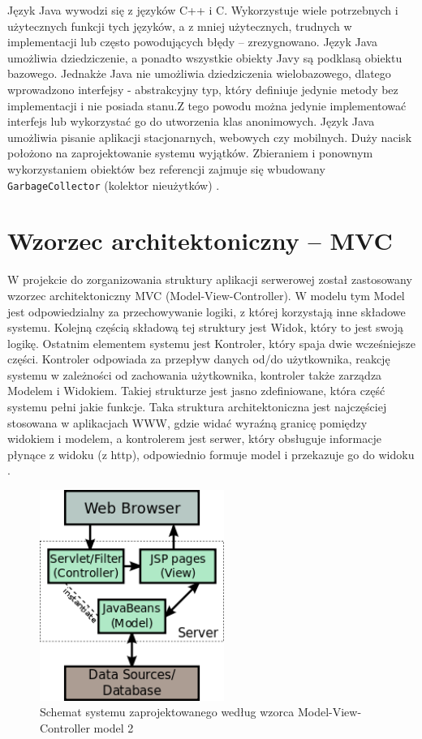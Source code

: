 \documentclass[eng,printmode,oneside]{mgr}
\begin{document}
Język Java wywodzi się z języków C++ i C. Wykorzystuje wiele potrzebnych i
użytecznych funkcji tych języków, a z mniej użytecznych, trudnych w
implementacji lub często powodujących błędy -- zrezygnowano. Język Java
umożliwia dziedziczenie, a ponadto wszystkie obiekty Javy są podklasą obiektu
bazowego. Jednakże Java nie umożliwia dziedziczenia wielobazowego, dlatego wprowadzono interfejsy -
abstrakcyjny typ, który definiuje jedynie metody bez implementacji i nie
posiada stanu.Z tego powodu można jedynie implementować
interfejs lub wykorzystać go do utworzenia klas anonimowych. Język Java
umożliwia pisanie aplikacji stacjonarnych, webowych czy mobilnych. Duży nacisk
położono na zaprojektowanie systemu wyjątków. Zbieraniem i ponownym
wykorzystaniem obiektów bez referencji zajmuje się wbudowany
\texttt{GarbageCollector} (kolektor nieużytków) \cite{java.doc}.

\section{Wzorzec architektoniczny -- MVC}

W projekcie do zorganizowania struktury aplikacji serwerowej został zastosowany
wzorzec architektoniczny MVC (Model-View-Controller). W modelu tym Model jest
odpowiedzialny za przechowywanie logiki, z której korzystają inne składowe
systemu. Kolejną częścią składową tej struktury jest Widok, który to jest
 swoją
logikę. Ostatnim elementem systemu jest Kontroler, który spaja dwie wcześniejsze
części. Kontroler odpowiada za przepływ danych od/do użytkownika, reakcję systemu w zależności od zachowania użytkownika,
kontroler także zarządza Modelem i Widokiem. Takiej strukturze jest jasno
zdefiniowane, która część systemu pełni jakie funkcje. Taka struktura
architektoniczna jest najczęściej stosowana w aplikacjach WWW, gdzie widać
wyraźną granicę pomiędzy widokiem i modelem, a kontrolerem jest serwer, który
obsługuje informacje płynące z widoku (z http), odpowiednio formuje model i
przekazuje go do widoku \cite{java.mvc,java.mvc.grafika}.

\begin{figure}[ht!]
\centering
\includegraphics[width=60mm]{jspModel.png}
\caption{Schemat systemu zaprojektowanego według wzorca
Model-View-Controller model 2 \cite{java.mvc.grafika}}
\label{fig:MVC2}
\end{figure}
\end{document}
